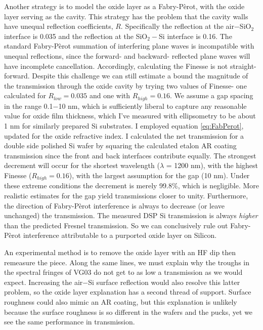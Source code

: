 Another strategy is to model the oxide layer as a Fabry-P\`erot, with the oxide layer serving as the cavity.  This strategy has the problem that the cavity walls have unequal reflection coefficients, $R$.  Specifically the reflection at the air$-$SiO$_2$ interface is 0.035 and the reflection at the SiO$_{2}-$Si interface is 0.16.  The standard Fabry-P\`erot summation of interfering plane waves is incompatible with unequal reflections, since the forward- and backward- reflected plane waves will have incomplete cancellation.  Accordingly, calculating the Finesse is not straight-forward.  Despite this challenge we can still estimate a bound the magnitude of the transmission through the oxide cavity by trying two values of Finesse- one calculated for $R_{low}=0.035$ and one with $R_{high}=0.16$.  We assume a gap spacing in the range 0.1$-$10 nm, which is sufficiently liberal to  capture any reasonable value for oxide film thickness, which I've measured with ellipsometry to be about 1 nm for similarly prepared Si substrates.  I employed equation \ref{eq:FabPerot}, updated for the oxide refractive index.  I calculated the net transmission for a double side polished Si wafer by squaring the calculated etalon AR coating transmission since the front and back interfaces contribute equally.  The strongest decrement will occur for the shortest wavelength ($\lambda$ = 1200 nm), with the highest Finesse ($R_{high}=0.16$), with the largest assumption for the gap (10 nm).  Under these extreme conditions the decrement is merely 99.8\%, which is negligible.  More realistic estimates for the gap yield transmissions closer to unity.  Furthermore, the direction of Fabry-P\`erot interference is always to decrease (or leave unchanged) the transmission.  The measured DSP Si transmission is always \emph{higher} than the predicted Fresnel transmission.  So we can conclusively rule out Fabry-P\`erot interference attributable to a purported oxide layer on Silicon.  
 
An experimental method is to remove the oxide layer with an HF dip then remeasure the piece.  Along the same lines, we must explain why the troughs in the spectral fringes of VG03 do not get to as low a transmission as we would expect.  Increasing the air$-$Si surface reflection would also resolve this latter problem, so the oxide layer explanation has a second thread of support.  Surface roughness could also mimic an AR coating, but this explanation is unlikely because the surface roughness is so different in the wafers and the pucks, yet we see the same performance in transmission.  

